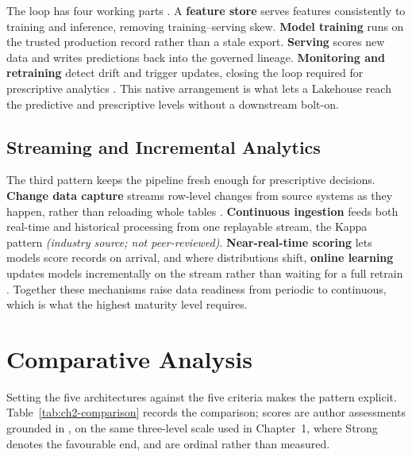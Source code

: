 The loop has four working parts \parencite{kreuzberger2023}. A \textbf{feature store} serves features consistently to training and inference, removing training--serving skew. \textbf{Model training} runs on the trusted production record rather than a stale export. \textbf{Serving} scores new data and writes predictions back into the governed lineage. \textbf{Monitoring and retraining} detect drift and trigger updates, closing the loop required for prescriptive analytics \parencite{feedback2025, futurei2025}. This native arrangement is what lets a Lakehouse reach the predictive and prescriptive levels without a downstream bolt-on.

\subsection{Streaming and Incremental Analytics}
\label{subsec:ch2-streaming}

The third pattern keeps the pipeline fresh enough for prescriptive decisions. \textbf{Change data capture} streams row-level changes from source systems as they happen, rather than reloading whole tables \parencite{kleppmann2017}. \textbf{Continuous ingestion} feeds both real-time and historical processing from one replayable stream, the Kappa pattern \parencite{kreps2014} \textit{(industry source; not peer-reviewed)}. \textbf{Near-real-time scoring} lets models score records on arrival, and where distributions shift, \textbf{online learning} updates models incrementally on the stream rather than waiting for a full retrain \parencite{bifet2018}. Together these mechanisms raise data readiness from periodic to continuous, which is what the highest maturity level requires.

\section{Comparative Analysis}
\label{sec:ch2-comparison}

Setting the five architectures against the five criteria makes the pattern explicit. Table~\ref{tab:ch2-comparison} records the comparison; scores are author assessments grounded in \parencite{marz2015, kreps2014, nambiar2022, armbrust2021, databricks2022}, on the same three-level scale used in Chapter~1, where Strong denotes the favourable end, and are ordinal rather than measured.

